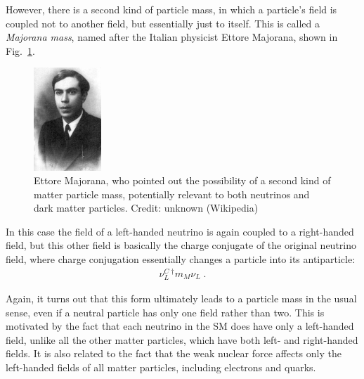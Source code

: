 \documentclass[12pt]{iopart}
\begin{document}
However, there is a second kind of particle mass, in which a particle's field is coupled not to another field, but essentially just to itself. This is called a \textit{Majorana mass}, named after the Italian physicist Ettore Majorana, shown in Fig.~\ref{Fig21a-EttoreMajorana.eps}.
\begin{figure}[htbp]
\centering
\includegraphics[bb=0 0 100 560, width=1.0in]{Fig21a-EttoreMajorana.eps}
\caption{Ettore Majorana, who pointed out the possibility of a second kind of matter particle mass, potentially relevant to both neutrinos and dark matter particles. Credit: unknown (Wikipedia) \label{Fig21a-EttoreMajorana.eps}}
\end{figure}
In this case the field of a left-handed neutrino is again coupled to a right-handed field, but this other field is basically the charge conjugate of the original neutrino field, where charge conjugation essentially changes a particle into its antiparticle:
\begin{eqnarray}
\nu_L^C \, ^{\dag}  m_M \nu_L \; .
\label{eq1.3}
\end{eqnarray}

Again, it turns out that this form ultimately leads to a particle mass in the usual sense, even if a neutral particle has only one field rather than two. This is motivated by the fact that each neutrino in the SM does have only a left-handed field, unlike all the other matter particles, which have both left- and right-handed fields. It is also related to the fact that the weak nuclear force affects only the left-handed fields of all matter particles, including electrons and quarks.
\end{document}

